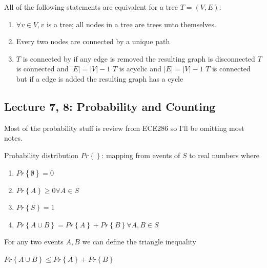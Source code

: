 \documentclass[../notes.tex]{subfiles}
\begin{document}
\begin{theorem}
	All of the following statements are equivalent for a tree $ T = (V, E) $:

	\begin{enumerate}
		\item $ \forall v \in V, v $ is a tree; all nodes in a tree are trees unto themselves.
		\item Every two nodes are connected by a unique path
		\item $ T $ is connected by if any edge is removed the resulting graph is disconnected
			$ T $ is connected and $ |E| = |V| - 1 $   
			$ T $ is acyclic and $ |E| = |V| - 1 $   
			$ T $ is connected but if a edge is added the resulting graph has a cycle
	\end{enumerate}



\end{theorem}






\subsection{Lecture 7, 8: Probability and Counting}

Most of the probability stuff is review from ECE286 so I'll be omitting most notes.


\begin{definition}
	Probability distribution $ Pr \left\{  \right\}  $: mapping from events of $ S $ to real numbers where

	\begin{enumerate}
		\item $ Pr \left\{ \emptyset \right\} = 0 $
		\item $ Pr \left\{ A \right\} \ge  0  \forall A \in S $
		\item $ Pr \left\{ S \right\} = 1 $
		\item $ Pr \left\{ A \cup B \right\} = Pr \left\{ A \right\} + Pr \left\{ B \right\} \forall A, B \in S $
	\end{enumerate}
\end{definition}

For any two events $ A, B $ we can define the triangle inequality
\begin{definition}
	$ Pr \left\{ A \cup B \right\} \le Pr \left\{ A \right\} + Pr \left\{ B \right\} $
\end{definition}
\end{document}
